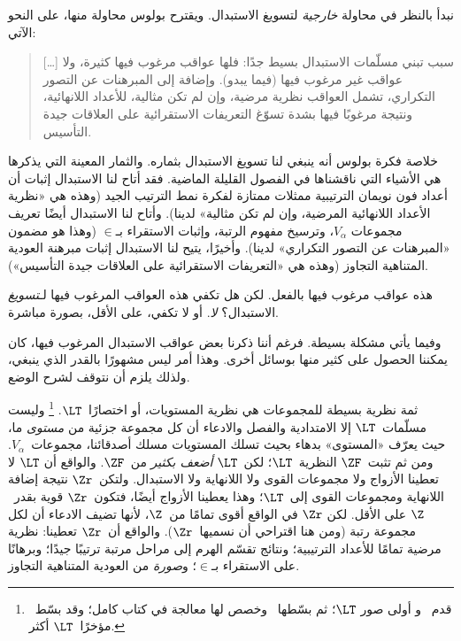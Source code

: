 \documentclass[../../../include/open-logic-section]{subfiles}
\begin{document}

نبدأ بالنظر في محاولة \emph{خارجية} لتسويغ الاستبدال. ويقترح بولوس
محاولة منها، على النحو الآتي:
\begin{quote}
  [\ldots] سبب تبني مسلّمات الاستبدال بسيط جدًا: فلها عواقب مرغوب
  فيها كثيرة، ولا عواقب غير مرغوب فيها (فيما يبدو). وإضافة إلى
  المبرهنات عن التصور التكراري، تشمل العواقب نظرية مرضية، وإن لم تكن
  مثالية، للأعداد اللانهائية، ونتيجة مرغوبًا فيها بشدة تسوّغ التعريفات
  الاستقرائية على العلاقات جيدة التأسيس.
  \citep[229]{Boolos1971}
\end{quote}
خلاصة فكرة بولوس أنه ينبغي لنا تسويغ الاستبدال بثماره. والثمار المعينة
التي يذكرها هي الأشياء التي ناقشناها في الفصول القليلة الماضية. فقد
أتاح لنا الاستبدال إثبات أن أعداد فون نويمان الترتيبية ممثلات ممتازة
لفكرة نمط الترتيب الجيد (وهذه هي «نظرية الأعداد اللانهائية المرضية،
وإن لم تكن مثالية» لدينا). وأتاح لنا الاستبدال أيضًا تعريف مجموعات
$V_\alpha$، وترسيخ مفهوم الرتبة، وإثبات الاستقراء بـ$\in$ (وهذا هو
مضمون «المبرهنات عن التصور التكراري» لدينا). وأخيرًا، يتيح لنا
الاستبدال إثبات مبرهنة العودية المتناهية التجاوز (وهذه هي «التعريفات
الاستقرائية على العلاقات جيدة التأسيس»).

هذه عواقب مرغوب فيها بالفعل. لكن هل تكفي هذه العواقب المرغوب فيها
لـ\emph{تسويغ} الاستبدال؟ \emph{لا}. أو لا تكفي، على الأقل، بصورة
مباشرة.

وفيما يأتي مشكلة بسيطة. فرغم أننا ذكرنا بعض عواقب الاستبدال المرغوب
فيها، كان يمكننا الحصول على كثير منها بوسائل أخرى. وهذا أمر ليس مشهورًا
بالقدر الذي ينبغي، ولذلك يلزم أن نتوقف لشرح الوضع.

ثمة نظرية بسيطة للمجموعات هي نظرية المستويات، أو اختصارًا~$\LT$.
\footnote{قدم~\citet{Montague1965} و\citet{Scott1974} أولى صور
  $\LT$؛ ثم بسّطها~\citet{Potter2004} وخصص لها معالجة في كتاب كامل؛
  وقد بسّط~\citet{ButtonLT1} مؤخرًا~$\LT$ أكثر.}
وليست مسلّمات~$\LT$ إلا الامتدادية والفصل والادعاء أن كل مجموعة
جزئية من \emph{مستوى} ما، حيث يعرّف «المستوى» بدهاء بحيث تسلك
المستويات مسلك أصدقائنا، مجموعات~$V_\alpha$. ومن ثم تثبت~$\ZF$
النظرية~$\LT$؛ لكن~$\LT$ \emph{أضعف بكثير} من~$\ZF$. والواقع أن
$\LT$ لا تعطينا الأزواج ولا مجموعات القوى ولا اللانهاية ولا الاستبدال.
ولتكن~$\Zr$ نتيجة إضافة اللانهاية ومجموعات القوى إلى~$\LT$؛ وهذا
يعطينا الأزواج أيضًا، فتكون~$\Zr$ قوية بقدر~$\Z$ على الأقل. لكن
$\Zr$ في الواقع أقوى تمامًا من~$\Z$، لأنها تضيف الادعاء أن لكل
مجموعة رتبة (ومن هنا اقتراحي أن نسميها~$\Zr$). والواقع أن~$\Zr$
تعطينا: نظرية مرضية تمامًا للأعداد الترتيبية؛ ونتائج تقسّم الهرم إلى
مراحل مرتبة ترتيبًا جيدًا؛ وبرهانًا على الاستقراء بـ$\in$؛
و\emph{صورة} من العودية المتناهية التجاوز.
\end{document}
